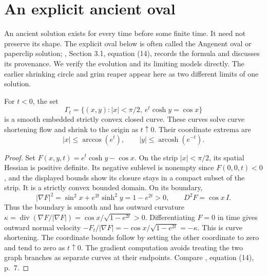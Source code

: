 \chapter{An explicit ancient oval}\label{sec:examples-ancient-curves}
An ancient solution exists for every time before some finite time. It need not preserve its shape. The explicit oval below is often called the Angenent oval or paperclip solution; \cite{BV11}, Section 3.1, equation (14), records the formula and discusses its provenance. We verify the evolution and its limiting models directly. The earlier shrinking circle and grim reaper appear here as two different limits of one solution.

\begin{theorem}\label{thm:explicit-ancient-oval}
For $t<0$, the set
\[
 \Gamma_t=\{(x,y):|x|<\pi/2,\ e^t\cosh y=\cos x\}
\]
is a smooth embedded strictly convex closed curve. These curves solve curve shortening flow and shrink to the origin as $t\uparrow0$. Their coordinate extrema are
\[
 |x|\leq\arccos(e^t),\qquad |y|\leq\operatorname{arcosh}(e^{-t}).
\]
\end{theorem}
\begin{proof}
Set $F(x,y,t)=e^t\cosh y-\cos x$. On the strip $|x|<\pi/2$, its spatial Hessian is positive definite. Its negative sublevel is nonempty since $F(0,0,t)<0$, and the displayed bounds show its closure stays in a compact subset of the strip. It is a strictly convex bounded domain. On its boundary,
\[
 |\nabla F|^2=\sin^2x+e^{2t}\sinh^2y=1-e^{2t}>0,
 \qquad D^2F=\cos x\,I.
\]
Thus the boundary is smooth and has outward curvature $\kappa=\operatorname{div}(\nabla F/|\nabla F|)=\cos x/\sqrt{1-e^{2t}}>0$. Differentiating $F=0$ in time gives outward normal velocity $-F_t/|\nabla F|=-\cos x/\sqrt{1-e^{2t}}=-\kappa$. This is curve shortening. The coordinate bounds follow by setting the other coordinate to zero and tend to zero as $t\uparrow0$. The gradient computation avoids treating the two graph branches as separate curves at their endpoints. Compare \cite{BV11}, equation (14), p.~7.
\end{proof}

